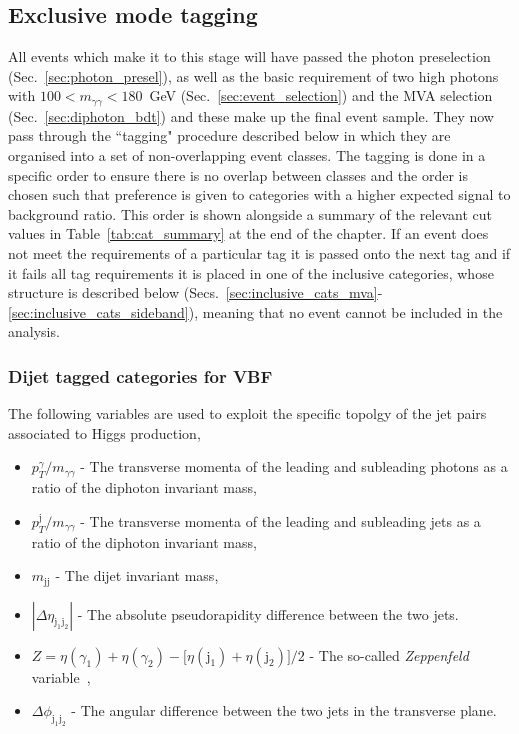 \subsection{Exclusive mode tagging}
\label{sec:exclusive_tags}
All events which make it to this stage will have passed the photon preselection (Sec.~\ref{sec:photon_presel}), as well as the basic requirement of two high \pT photons with $100<m_{\gamma\gamma}<180$~GeV (Sec.~\ref{sec:event_selection}) and the MVA selection (Sec.~\ref{sec:diphoton_bdt}) and these make up the final event sample. They now pass through the ``tagging" procedure described below in which they are organised into a set of non-overlapping event classes. The tagging is done in a specific order to ensure there is no overlap between classes and the order is chosen such that preference is given to categories with a higher expected signal to background ratio. This order is shown alongside a summary of the relevant cut values in Table~\ref{tab:cat_summary} at the end of the chapter. If an event does not meet the requirements of a particular tag it is passed onto the next tag and if it fails all tag requirements it is placed in one of the inclusive categories, whose structure is described below (Secs.~\ref{sec:inclusive_cats_mva}-\ref{sec:inclusive_cats_sideband}), meaning that no event cannot be included in the analysis. 

\subsubsection{Dijet tagged categories for VBF}
\label{sec:vbf_tag}

The following variables are used to exploit the specific topolgy of the jet pairs associated to \VBF Higgs production,

\begin{itemize}
  \item $p_{T}^{\gamma}/m_{\gamma\gamma}$ - The transverse momenta of the leading and subleading photons as a ratio of the diphoton invariant mass,
  \item $p_{T}^{\mathrm{j}}/m_{\gamma\gamma}$ - The transverse momenta of the leading and subleading jets as a ratio of the diphoton invariant mass,
  \item $m_{\mathrm{jj}}$ - The dijet invariant mass,
  \item $|\Delta\eta_{\mathrm{j}_{1}\mathrm{j}_{2}}|$ - The absolute pseudorapidity difference between the two jets.
  \item $Z = \eta(\gamma_{1})+\eta(\gamma_{2}) - \bigl[\eta(\mathrm{j}_{1})+\eta(\mathrm{j}_{2})\bigr]/2$ - The so-called \emph{Zeppenfeld} variable~\cite{Zeppenfeld},
  \item $\Delta\phi_{\mathrm{j}_{1}\mathrm{j}_{2}}$ - The angular difference between the two jets in the transverse plane.
\end{itemize}

